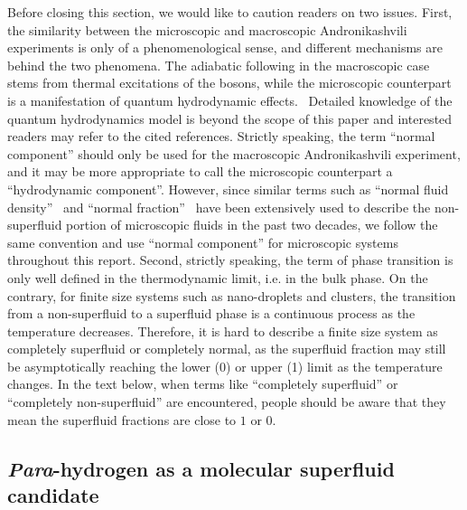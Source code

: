 \documentclass[12pt]{iopart}
\begin{document}
Before closing this section, we would like to caution readers on two issues. First, the similarity between the microscopic and macroscopic Andronikashvili experiments is only of a phenomenological sense, and different mechanisms are behind the two phenomena. The adiabatic following in the macroscopic case stems from thermal excitations of the bosons, while the microscopic counterpart is a manifestation of quantum hydrodynamic effects.~\cite{lehmann_sf_hydro,lehmann_hydro_erratum,lehmann_impurity_he,lehman_sf6_hydro} Detailed knowledge of the quantum hydrodynamics model is beyond the scope of this paper and interested readers may refer to the cited references. Strictly speaking, the term ``normal component'' should only be used for the macroscopic Andronikashvili experiment, and it may be more appropriate to call the microscopic counterpart a ``hydrodynamic component''. However, since similar terms such as ``normal fluid density''~\cite{ceperley_rmp_1995} and ``normal fraction''~\cite{sindzingre_pH2_superfluid} have been extensively used to describe the non-superfluid portion of microscopic fluids in the past two decades, we follow the same convention and use ``normal component'' for microscopic systems throughout this report. 
Second, strictly speaking, the term of phase transition is only well defined in the thermodynamic limit, i.e. in the bulk phase. On the contrary, for finite size systems such as nano-droplets and clusters, the transition from a non-superfluid to a superfluid phase is a continuous process as the temperature decreases. Therefore, it is hard to describe a finite size system as completely superfluid or completely normal, as the superfluid fraction may still be asymptotically reaching the lower (0) or upper (1) limit as the temperature changes. In the text below, when terms like ``completely superfluid'' or ``completely non-superfluid'' are encountered, people should be aware that they mean the superfluid fractions are close to $1$ or $0$.

\subsection{{\em Para}-hydrogen as a molecular superfluid candidate}
\end{document}
